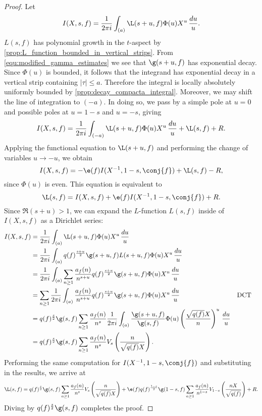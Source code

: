     \begin{proof}
      Let
      \[
        I(X,s,f) = \frac{1}{2\pi i}\int_{(a)}\L(s+u,f)\Phi(u)X^{u}\,\frac{du}{u}.
      \]
      $L(s,f)$ has polynomial growth in the $t$-aspect by \cref{prop:L_function_bounded_in_vertical_strips}. From \cref{equ:modified_gamma_estimates} we see that $\g(s+u,f)$ has exponential decay. Since $\Phi(u)$ is bounded, it follows that the integrand has exponential decay in a vertical strip containing $|\tau| \le a$. Therefore the integral is locally absolutely uniformly bounded by \cref{prop:decay_compacta_integral}. Moreover, we may shift the line of integration to $(-a)$. In doing so, we pass by a simple pole at $u = 0$ and possible poles at $u = 1-s$ and $u = -s$, giving
      \[
        I(X,s,f) = \frac{1}{2\pi i}\int_{(-a)}\L(s+u,f)\Phi(u)X^{u}\,\frac{du}{u}+\L(s,f)+R.
      \]
      Applying the functional equation to $\L(s+u,f)$ and performing the change of variables $u \to -u$, we obtain
      \[
        I(X,s,f) = -\e(f)I(X^{-1},1-s,\conj{f})+\L(s,f)-R,
      \]
      since $\Phi(u)$ is even. This equation is equivalent to
      \[
        \L(s,f) = I(X,s,f)+\e(f)I(X^{-1},1-s,\conj{f})+R.
      \]
      Since $\Re(s+u) > 1$, we can expand the $L$-function $L(s,f)$ inside of $I(X,s,f)$ as a Dirichlet series:
      \begin{align*}
        I(X,s,f) &= \frac{1}{2\pi i}\int_{(a)}\L(s+u,f)\Phi(u)X^{u}\,\frac{du}{u} \\
        &= \frac{1}{2\pi i}\int_{(a)}q(f)^{\frac{s+u}{2}}\g(s+u,f)L(s+u,f)\Phi(u)X^{u}\,\frac{du}{u} \\
        &= \frac{1}{2\pi i}\int_{(a)}\sum_{n \ge 1}\frac{a_{f}(n)}{n^{s+u}}q(f)^{\frac{s+u}{2}}\g(s+u,f)\Phi(u)X^{u}\,\frac{du}{u} \\
        &= \sum_{n \ge 1}\frac{1}{2\pi i}\int_{(a)}\frac{a_{f}(n)}{n^{s+u}}q(f)^{\frac{s+u}{2}}\g(s+u,f)\Phi(u)X^{u}\,\frac{du}{u} && \text{DCT} \\
        &= q(f)^{\frac{s}{2}}\g(s,f)\sum_{n \ge 1}\frac{a_{f}(n)}{n^{s}}\frac{1}{2\pi i}\int_{(a)}\frac{\g(s+u,f)}{\g(s,f)}\Phi(u)\left(\frac{\sqrt{q(f)}X}{n}\right)^{u}\,\frac{du}{u} \\
        &= q(f)^{\frac{s}{2}}\g(s,f)\sum_{n \ge 1}\frac{a_{f}(n)}{n^{s}}V_{s}\left(\frac{n}{\sqrt{q(f)}X}\right).
      \end{align*}
      Performing the same computation for $I(X^{-1},1-s,\conj{f})$ and substituting in the results, we arrive at
      \[
        \L(s,f) = q(f)^{\frac{s}{2}}\g(s,f)\sum_{n \ge 1}\frac{a_{f}(n)}{n^{s}}V_{s}\left(\frac{n}{\sqrt{q(f)}X}\right)+\e(f)q(f)^{\frac{1-s}{2}}\g(1-s,f)\sum_{n \ge 1}\frac{a_{f}(n)}{n^{1-s}}V_{1-s}\left(\frac{nX}{\sqrt{q(f)}}\right)+R.
      \]
      Diving by $q(f)^{\frac{s}{2}}\g(s,f)$ completes the proof.
    \end{proof}

